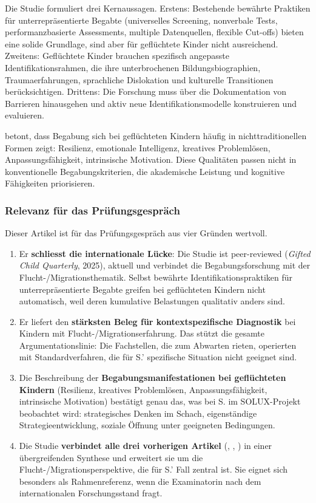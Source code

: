 \documentclass[ngerman, a4paper]{article}
\begin{document}
Die Studie formuliert drei Kernaussagen. Erstens: Bestehende bewährte
Praktiken für unterrepräsentierte Begabte (universelles Screening,
nonverbale Tests, performanzbasierte Assessments, multiple Datenquellen,
flexible Cut-offs) bieten eine solide Grundlage, sind aber für geflüchtete
Kinder nicht ausreichend. Zweitens: Geflüchtete Kinder brauchen spezifisch
angepasste Identifikationsrahmen, die ihre unterbrochenen
Bildungsbiographien, Traumaerfahrungen, sprachliche Dislokation und
kulturelle Transitionen berücksichtigen. Drittens: Die Forschung muss über
die Dokumentation von Barrieren hinausgehen und aktiv neue
Identifikationsmodelle konstruieren und evaluieren.

\textcite{alodat2025equitable} betont, dass Begabung sich bei geflüchteten
Kindern häufig in nichttraditionellen Formen zeigt: Resilienz, emotionale
Intelligenz, kreatives Problemlösen, Anpassungsfähigkeit, intrinsische
Motivation. Diese Qualitäten passen nicht in konventionelle
Begabungskriterien, die akademische Leistung und kognitive Fähigkeiten
priorisieren.

\subsubsection*{Relevanz für das Prüfungsgespräch}

Dieser Artikel ist für das Prüfungsgespräch aus vier Gründen wertvoll.

\begin{enumerate}
  \item Er \textbf{schliesst die internationale Lücke}: Die Studie ist
    peer-reviewed (\textit{Gifted Child Quarterly}, 2025), aktuell und
    verbindet die Begabungsforschung mit der Flucht-/Migrationsthematik.
    Selbst bewährte Identifikationspraktiken für unterrepräsentierte
    Begabte greifen bei geflüchteten Kindern nicht automatisch, weil
    deren kumulative Belastungen qualitativ anders sind.
  \item Er liefert den \textbf{stärksten Beleg für kontextspezifische
    Diagnostik} bei Kindern mit Flucht-/Migrationserfahrung. Das stützt
    die gesamte Argumentationslinie: Die Fachstellen, die zum Abwarten
    rieten, operierten mit Standardverfahren, die für S.' spezifische
    Situation nicht geeignet sind.
  \item Die Beschreibung der \textbf{Begabungsmanifestationen bei
    geflüchteten Kindern} (Resilienz, kreatives Problemlösen,
    Anpassungsfähigkeit, intrinsische Motivation) bestätigt genau das,
    was bei S. im SOLUX-Projekt beobachtet wird: strategisches Denken im
    Schach, eigenständige Strategieentwicklung, soziale Öffnung unter
    geeigneten Bedingungen.
  \item Die Studie \textbf{verbindet alle drei vorherigen Artikel}
    (\textcite{mun2020identifying}, \textcite{gubbins2020promising},
    \textcite{alhroub2021utility}) in einer übergreifenden Synthese und
    erweitert sie um die Flucht-/Migrationsperspektive, die für S.' Fall
    zentral ist. Sie eignet sich besonders als Rahmenreferenz, wenn die
    Examinatorin nach dem internationalen Forschungsstand fragt.
\end{enumerate}
\end{document}
